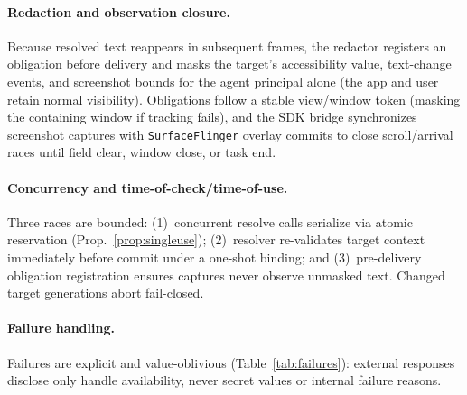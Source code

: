 \paragraph{Redaction and observation closure.} Because resolved text reappears in subsequent frames, the redactor registers an obligation before delivery and masks the target's accessibility value, text-change events, and screenshot bounds for the agent principal alone (the app and user retain normal visibility). Obligations follow a stable view/window token (masking the containing window if tracking fails), and the SDK bridge synchronizes screenshot captures with \texttt{SurfaceFlinger} overlay commits to close scroll/arrival races until field clear, window close, or task end.

\paragraph{Concurrency and time-of-check/time-of-use.} Three races are bounded: (1)~concurrent resolve calls serialize via atomic reservation (Prop.~\ref{prop:singleuse}); (2)~resolver re-validates target context immediately before commit under a one-shot binding; and (3)~pre-delivery obligation registration ensures captures never observe unmasked text. Changed target generations abort fail-closed.

\paragraph{Failure handling.} Failures are explicit and value-oblivious (Table~\ref{tab:failures}): external responses disclose only handle availability, never secret values or internal failure reasons.

